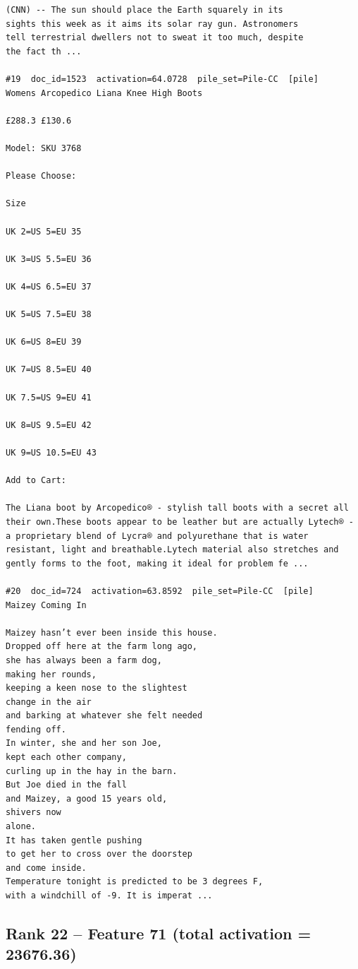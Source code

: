 \begin{verbatim}
(CNN) -- The sun should place the Earth squarely in its
sights this week as it aims its solar ray gun. Astronomers
tell terrestrial dwellers not to sweat it too much, despite
the fact th ...

#19  doc_id=1523  activation=64.0728  pile_set=Pile-CC  [pile]
Womens Arcopedico Liana Knee High Boots

£288.3 £130.6

Model: SKU 3768

Please Choose:

Size

UK 2=US 5=EU 35

UK 3=US 5.5=EU 36

UK 4=US 6.5=EU 37

UK 5=US 7.5=EU 38

UK 6=US 8=EU 39

UK 7=US 8.5=EU 40

UK 7.5=US 9=EU 41

UK 8=US 9.5=EU 42

UK 9=US 10.5=EU 43

Add to Cart:

The Liana boot by Arcopedico® - stylish tall boots with a secret all their own.These boots appear to be leather but are actually Lytech® - a proprietary blend of Lycra® and polyurethane that is water resistant, light and breathable.Lytech material also stretches and gently forms to the foot, making it ideal for problem fe ...

#20  doc_id=724  activation=63.8592  pile_set=Pile-CC  [pile]
Maizey Coming In

Maizey hasn’t ever been inside this house.
Dropped off here at the farm long ago,
she has always been a farm dog,
making her rounds,
keeping a keen nose to the slightest
change in the air
and barking at whatever she felt needed
fending off.
In winter, she and her son Joe,
kept each other company,
curling up in the hay in the barn.
But Joe died in the fall
and Maizey, a good 15 years old,
shivers now
alone.
It has taken gentle pushing
to get her to cross over the doorstep
and come inside.
Temperature tonight is predicted to be 3 degrees F,
with a windchill of -9. It is imperat ...

\end{verbatim}

\subsection*{Rank 22 -- Feature 71 (total activation = 23676.36)}

